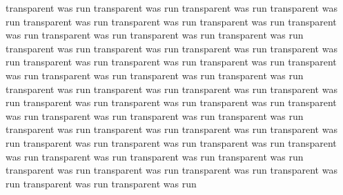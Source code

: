 transparent was run
transparent was run
transparent was run
transparent was run
transparent was run
transparent was run
transparent was run
transparent was run
transparent was run
transparent was run
transparent was run
transparent was run
transparent was run
transparent was run
transparent was run
transparent was run
transparent was run
transparent was run
transparent was run
transparent was run
transparent was run
transparent was run
transparent was run
transparent was run
transparent was run
transparent was run
transparent was run
transparent was run
transparent was run
transparent was run
transparent was run
transparent was run
transparent was run
transparent was run
transparent was run
transparent was run
transparent was run
transparent was run
transparent was run
transparent was run
transparent was run
transparent was run
transparent was run
transparent was run
transparent was run
transparent was run
transparent was run
transparent was run
transparent was run
transparent was run
